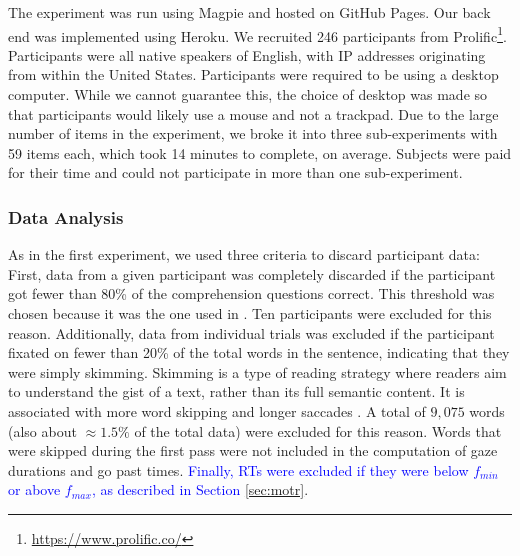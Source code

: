 \documentclass[12pt]{article}
\newcommand{\change}[1]{\textcolor{blue}{#1}}
\begin{document}
{The experiment was run using Magpie and hosted on GitHub Pages. Our back end was implemented using Heroku. We recruited %
246 participants from Prolific\footnote{\url{https://www.prolific.co/}}. Participants were all native speakers of English, with IP addresses originating from within the United States. Participants were required to be using a desktop computer. While we cannot guarantee this, the choice of desktop was made so that participants would likely use a mouse and not a trackpad. Due to the large number of items in the experiment, we broke it into three sub-experiments with 59 items each, which took 14 minutes to complete, on average. Subjects were paid for their time and could not participate in more than one sub-experiment.


\subsubsection{Data Analysis}


As in the first experiment, we used three criteria to discard participant data: First, data from a given participant was completely discarded if the participant got fewer than 80\% of the comprehension questions correct. This threshold was chosen because it was the one used in \citet{boyce2020amaze}. Ten participants were excluded for this reason. Additionally, data from individual trials was excluded if the participant fixated on fewer than 20\% of the total words in the sentence, indicating that they were simply skimming. Skimming is a type of reading strategy where readers aim to understand the gist of a text, rather than its full semantic content. It is associated with more word skipping and longer saccades \citep{liao2021using}. A total of $9,075$ words (also about $\approx 1.5\%$ of the total data) were excluded for this reason. Words that were skipped during the first pass were not included in the computation of gaze durations and go past times. \change{Finally, RTs were excluded if they were below $f_{min}$ or above $f_{max}$, as described in Section \ref{sec:motr}}. 

}
\end{document}
